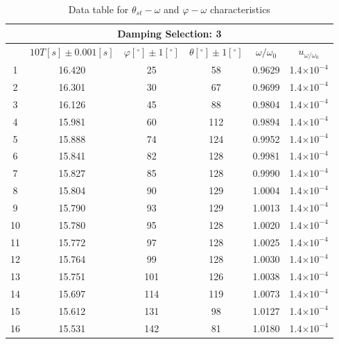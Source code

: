 \documentclass[a4paper,12pt]{article}
\begin{document}
\begin{table}[h]
\begin{center}
\begin{tabular}{|c|c|c|c|c|c|}
\hline
\multicolumn{6}{|c|}{ Damping Selection: 3} \\
\hline
   & $10T [s] \pm 0.001 [s]$ & $\varphi[^\circ] \pm 1 [^\circ]$ & $\theta[^\circ] \pm 1 [^\circ]$ & $\omega/\omega_0$ & $u_{\omega/\omega_0}$\\
\hline
1 & 16.420 & 25 & 58 & 0.9629 & 1.4$\times 10^{-4}$\\
2 & 16.301 & 30 & 67 & 0.9699 & 1.4$\times 10^{-4}$\\
3 & 16.126 & 45 & 88 & 0.9804 & 1.4$\times 10^{-4}$\\
4 & 15.981 & 60 & 112 & 0.9894 & 1.4$\times 10^{-4}$\\
5 & 15.888 & 74 & 124 & 0.9952 & 1.4$\times 10^{-4}$\\
6 & 15.841 & 82 & 128 & 0.9981 & 1.4$\times 10^{-4}$\\
7 & 15.827 & 85 & 128 & 0.9990 & 1.4$\times 10^{-4}$\\
8 & 15.804 & 90 & 129 & 1.0004 & 1.4$\times 10^{-4}$\\
9 & 15.790 & 93 & 129 & 1.0013 & 1.4$\times 10^{-4}$\\
10 & 15.780 & 95 & 128 & 1.0020 & 1.4$\times 10^{-4}$\\
11 & 15.772 & 97 & 128 & 1.0025 & 1.4$\times 10^{-4}$\\
12 & 15.764 & 99 & 128 & 1.0030 & 1.4$\times 10^{-4}$\\
13 & 15.751 & 101 & 126 & 1.0038 & 1.4$\times 10^{-4}$\\
14 & 15.697 & 114 & 119 & 1.0073 & 1.4$\times 10^{-4}$\\
15 & 15.612 & 131 & 98 & 1.0127 & 1.4$\times 10^{-4}$\\
16 & 15.531 & 142 & 81 & 1.0180 & 1.4$\times 10^{-4}$\\
\hline
\end{tabular}
\caption{Data table for $\theta_{st}-\omega$ and $\varphi-\omega$ characteristics}
\end{center}
\end{table}



\newpage
\end{document}
